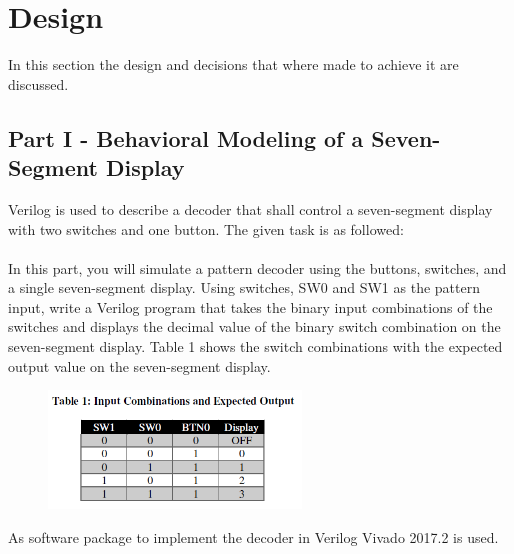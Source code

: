 \section{Design}\label{sec: Design}
In this section the design and decisions that where made to achieve it are discussed.

\subsection{Part I - Behavioral Modeling of a Seven-Segment Display}\label{sub: Behavioral Modeling of a Seven-Segment Display}
Verilog is used to describe a decoder that shall control a seven-segment display with two switches and one button. The given task is as followed:
\\
\\
In this part, you will simulate a pattern decoder using the buttons, switches, and a single seven-segment display.
Using switches, SW0 and SW1 as the pattern input, write a Verilog program that takes the binary input
combinations of the switches and displays the decimal value of the binary switch combination on the seven-segment
display. Table 1 shows the switch combinations with the expected output value on the seven-segment
display.

\begin{figure}[htbp]
	\centering
	\includegraphics[width=0.6\textwidth]{01_images/Vivado_lab2_part1_table1.png}
	\label{fig: Vivado_lab2_part1_table1}
\end{figure}

As software package to implement the decoder in Verilog Vivado 2017.2 is used. 

